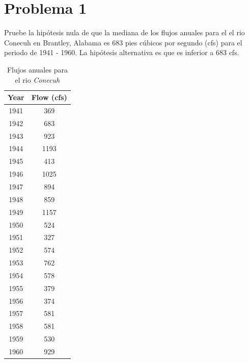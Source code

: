\documentclass[a4paper,12pt]{article} %
\begin{document}
		\section*{Problema 1} 
		Pruebe la hipótesis nula de que la mediana de los flujos anuales para el el rio Conecuh en Brantley, Alabama es 683 pies cúbicos por segundo (cfs) para el periodo de 1941 - 1960. La hipótesis alternativa es que es inferior a 683 cfs.\\
		\begin{table}[H]
			\centering
			\begin{tabular}{|c|c|} \hline
				\textbf{Year}&\textbf{Flow (cfs)} \\ \hline
				1941&369\\
				1942&683\\
				1943&923\\
				1944&1193\\
				1945&413\\
				1946&1025\\
				1947&894\\
				1948&859\\
				1949&1157\\
				1950&524\\
				1951&327\\
				1952&574\\
				1953&762\\
				1954&578\\
				1955&379\\
				1956&374\\
				1957&581\\
				1958&581\\
				1959&530\\
				1960&929\\\hline
			\end{tabular}
			\caption{Flujos anuales para el rio \textit{Conecuh}}
			\label{tab:my_label}
		\end{table}
		\newpage
\end{document}
